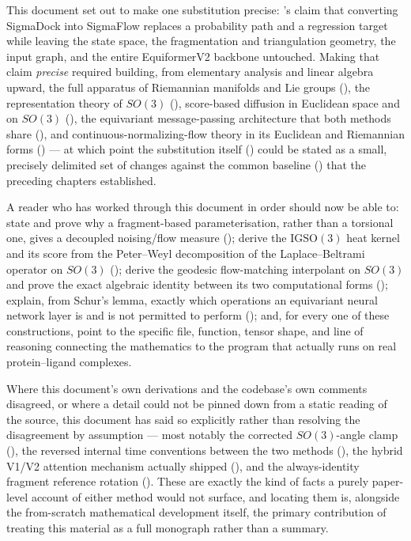\documentclass[11pt,a4paper]{report}
\theoremstyle{definition}
\theoremstyle{remark}
\begin{document}
This document set out to make one substitution precise:
's claim that converting SigmaDock
into SigmaFlow replaces a probability path and a regression target while
leaving the state space, the fragmentation and triangulation geometry, the
input graph, and the entire EquiformerV2 backbone untouched. Making that
claim \emph{precise} required building, from elementary analysis and linear
algebra upward, the full apparatus of Riemannian manifolds and Lie groups
(), the representation theory of $SO(3)$
(), score-based diffusion in Euclidean space and on
$SO(3)$ (), the equivariant
message-passing architecture that both methods share
(), and continuous-normalizing-flow
theory in its Euclidean and Riemannian forms
() --- at which point the
substitution itself () could be stated as a small,
precisely delimited set of changes against the common baseline
() that the preceding chapters established.

A reader who has worked through this document in order should now be able
to: state and prove why a fragment-based parameterisation, rather than a
torsional one, gives a decoupled noising/flow measure
(); derive the $\mathrm{IGSO}(3)$ heat
kernel and its score from the Peter--Weyl decomposition of the
Laplace--Beltrami operator on $SO(3)$ (); derive
the geodesic flow-matching interpolant on $SO(3)$ and prove the exact
algebraic identity between its two computational forms
(); explain, from Schur's lemma, exactly which
operations an equivariant neural network layer is and is not permitted to
perform (); and, for
every one of these constructions, point to the specific file, function,
tensor shape, and line of reasoning connecting the mathematics to the
program that actually runs on real protein--ligand complexes.

Where this document's own derivations and the codebase's own comments
disagreed, or where a detail could not be pinned down from a static reading
of the source, this document has said so explicitly rather than resolving
the disagreement by assumption --- most notably the corrected
$SO(3)$-angle clamp (), the reversed internal
time conventions between the two methods
(), the hybrid V1/V2 attention
mechanism actually shipped (), and the
always-identity fragment reference rotation
(). These are exactly the kind of
facts a purely paper-level account of either method would not surface, and
locating them is, alongside the from-scratch mathematical development
itself, the primary contribution of treating this material as a full
monograph rather than a summary.
\end{document}
